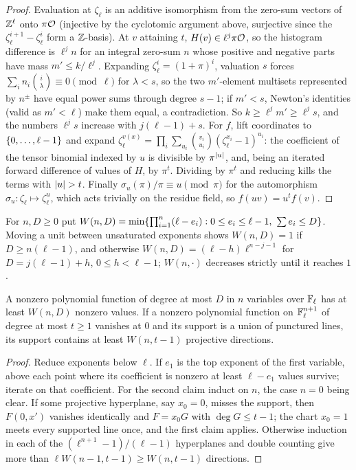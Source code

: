 \begin{proof}
Evaluation at $\zeta_\ell$ is an additive isomorphism from the zero-sum vectors of $\mathbb{Z}^\ell$ onto $\pi\mathcal{O}$ (injective by
the cyclotomic argument above, surjective since the $\zeta_\ell^{i+1}-\zeta_\ell^i$ form a $\mathbb{Z}$-basis). At $v$ attaining $t$,
$H(v)\in\ell^j\pi\mathcal{O}$, so the histogram difference is $\ell^jn$ for an integral zero-sum $n$ whose positive and
negative parts have mass $m'\le k/\ell^j$. Expanding $\zeta_\ell^i=(1+\pi)^i$, valuation $s$ forces
$\sum_in_i\binom i\lambda\equiv0\pmod\ell$ for $\lambda<s$, so the two $m'$-element multisets represented by $n^\pm$ have equal power
sums through degree $s-1$; if $m'<s$, Newton's identities (valid as $m'<\ell$) make them equal, a
contradiction. So $k\ge\ell^jm'\ge\ell^js$, and the numbers $\ell^js$ increase with $j(\ell-1)+s$. For $f$, lift coordinates
to $\{0,\dots,\ell-1\}$ and expand $\zeta_\ell^{v(x)}=\prod_i\sum_{u_i}\binom{v_i}{u_i}(\zeta_\ell^{x_i}-1)^{u_i}$: the coefficient of the tensor
binomial indexed by $u$ is divisible by $\pi^{\lvert u\rvert}$, and, being an iterated forward difference of values of $H$,
by $\pi^t$. Dividing by $\pi^t$ and reducing kills the terms with $\lvert u\rvert>t$. Finally $\sigma_u(\pi)/\pi\equiv u\pmod\pi$ for
the automorphism $\sigma_u:\zeta_\ell\mapsto\zeta_\ell^u$, which acts trivially on the residue field, so $f(uv)=u^tf(v)$.
\end{proof}

For $n,D\ge0$ put $W(n,D)=\min\{\prod_{i=1}^n(\ell-e_i):0\le e_i\le\ell-1,\ \sum e_i\le D\}$. Moving a unit between unsaturated
exponents shows $W(n,D)=1$ if $D\ge n(\ell-1)$, and otherwise $W(n,D)=(\ell-h)\ell^{n-j-1}$ for $D=j(\ell-1)+h$, $0\le h<\ell-1$;
$W(n,\cdot)$ decreases strictly until it reaches $1$.

\begin{lemma}\label{rec:lem:oproj}
A nonzero polynomial function of degree at most $D$ in $n$ variables over $\mathbb{F}_\ell$ has at least $W(n,D)$
nonzero values. If a nonzero polynomial function on $\mathbb{F}_\ell^{n+1}$ of degree at most $t\ge1$ vanishes at $0$
and its support is a union of punctured lines, its support contains at least $W(n,t-1)$ projective
directions.
\end{lemma}

\begin{proof}
Reduce exponents below $\ell$. If $e_1$ is the top exponent of the first variable, above each point where its
coefficient is nonzero at least $\ell-e_1$ values survive; iterate on that coefficient. For the second claim
induct on $n$, the case $n=0$ being clear. If some projective hyperplane, say $x_0=0$, misses the support,
then $F(0,x')$ vanishes identically and $F=x_0G$ with $\deg G\le t-1$; the chart $x_0=1$ meets every supported
line once, and the first claim applies. Otherwise induction in each of the $(\ell^{n+1}-1)/(\ell-1)$ hyperplanes and
double counting give more than $\ell W(n-1,t-1)\ge W(n,t-1)$ directions.
\end{proof}

